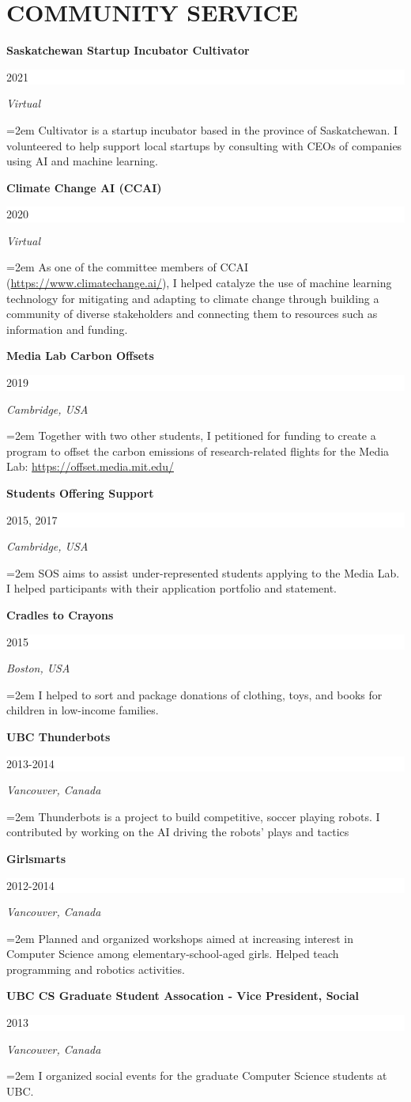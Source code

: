 \documentclass[paper=letter,fontsize=11pt]{scrartcl} %
\newcommand{\sepspace}{\vspace*{1em}}        %
\newcommand{\NewPart}[2]{\section*{\uppercase{#1} #2}}
\newcommand{\EducationEntry}[3]{
        \noindent \textbf{#1} \hfill      %
        \colorbox{White}{%
            \parbox{10em}{%
            \hfill\color{Black}#2}} \par  %
        \noindent \textit{#3} \par}
\newcommand{\ServiceEntry}[4]{
        \noindent \textbf{#1} \hfill      %
        \colorbox{White}{%
            \parbox{10em}{%
            \hfill\color{Black}#2}} \par  %
        \noindent \textit{#3} \par  %
        \noindent\hangindent=2em\hangafter=0 \small #4 %
        \normalsize \par}
\begin{document}
\NewPart{Community Service}{}



\ServiceEntry{Saskatchewan Startup Incubator Cultivator}{2021}{Virtual}
{Cultivator is a startup incubator based in the province of Saskatchewan. I volunteered to help support local startups by consulting with CEOs of companies using AI and machine learning.}
\sepspace

\ServiceEntry{Climate Change AI (CCAI)}{2020}{Virtual}
{As one of the committee members of CCAI (\url{https://www.climatechange.ai/}), I helped catalyze the use of machine learning technology for mitigating and adapting to climate change through building a community of diverse stakeholders and connecting them to resources such as information and funding.}
\sepspace

\ServiceEntry{Media Lab Carbon Offsets}{2019}{Cambridge, USA}
{Together with two other students, I petitioned for funding to create a program to offset the carbon emissions of research-related flights for the Media Lab: \url{https://offset.media.mit.edu/}}
\sepspace

\ServiceEntry{Students Offering Support}{2015, 2017}{Cambridge, USA}
{SOS aims to assist under-represented students applying to the Media Lab. I helped participants with their application portfolio and statement.}
\sepspace

\ServiceEntry{Cradles to Crayons}{2015}{Boston, USA}
{I helped to sort and package donations of clothing, toys, and books for children in low-income families.}
\sepspace

\ServiceEntry{UBC Thunderbots}{2013-2014}{Vancouver, Canada}
{Thunderbots is a project to build competitive, soccer playing robots. I contributed by working on the AI driving the robots' plays and tactics}
\sepspace

\ServiceEntry{Girlsmarts}{2012-2014}{Vancouver, Canada}
{Planned and organized workshops aimed at increasing interest in Computer Science among elementary-school-aged girls. Helped teach programming and robotics activities.}
\sepspace

\ServiceEntry{UBC CS Graduate Student Assocation - Vice President, Social }{2013}{Vancouver, Canada}
{I organized social events for the graduate Computer Science students at UBC.}
\sepspace
\end{document}
